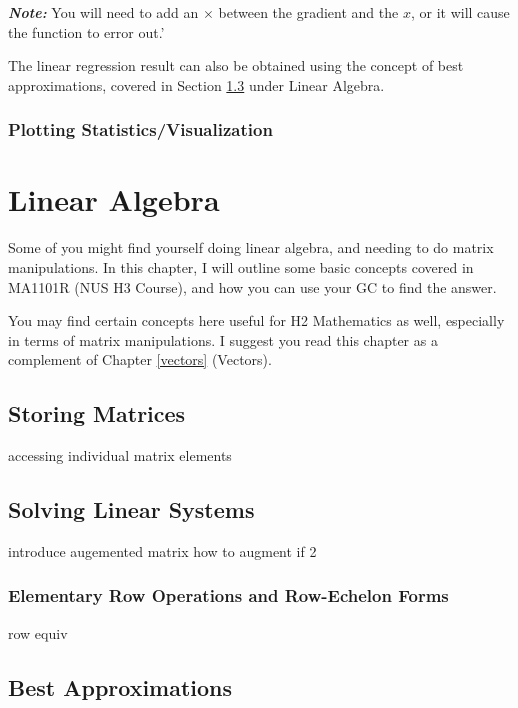 \documentclass[a5paper,draft]{memoir}
\def\note#1{\textbf{\textit{Note:}} #1}
\begin{document}
\note{You will need to add an $\times$ between the gradient and the $x$, or it will cause the function to error out.}'

The linear regression result can also be obtained using the concept of best approximations, covered in Section \ref{bestapprox} under Linear Algebra.

\subsection{Plotting Statistics/Visualization} \label{plotstat}


\chapter{Linear Algebra}
Some of you might find yourself doing linear algebra, and needing to do matrix manipulations. In this chapter, I will outline some basic concepts covered in MA1101R (NUS H3 Course), and how you can use your GC to find the answer.

You may find certain concepts here useful for H2 Mathematics as well, especially in terms of matrix manipulations. I suggest you read this chapter as a complement of Chapter \ref{vectors} (Vectors). 

\section{Storing Matrices}
accessing individual matrix elements

\section{Solving Linear Systems} \label{solvLinSys}
introduce augemented matrix
how to augment if 2

\subsection{Elementary Row Operations and Row-Echelon Forms}
row equiv

\section{Best Approximations} \label{bestapprox}

\printindex
\end{document}
